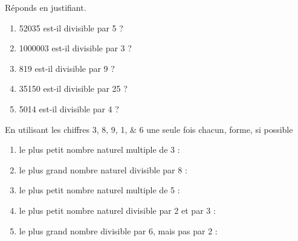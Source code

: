 \documentclass[../../syllabus_1.tex]{subfiles}
\begin{document}
\begin{exercise}
      Réponds en justifiant.
      \begin{enumerate}[itemsep=1cm, after=\vspace*{1cm}]
            \item \num{52035} est-il divisible par 5 ?
            \item \num{1000003} est-il divisible par 3 ?
            \item \num{819} est-il divisible par 9 ?
            \item \num{35150} est-il divisible par 25 ?
            \item \num{5014} est-il divisible par 4 ?
      \end{enumerate}
\end{exercise}

\begin{exercise}
      En utilisant les chiffres \numlist{3;8;9;1;6} une seule fois chacun, forme, si possible
      \begin{enumerate}
            \item le plus petit nombre naturel multiple de 3 :
            \item le plus grand nombre naturel divisible par 8 :
            \item le plus petit nombre naturel multiple de 5 :
            \item le plus petit nombre naturel divisible par 2 et par 3 :
            \item le plus grand nombre divisible par 6, mais pas par 2 :
      \end{enumerate}
\end{exercise}
\end{document}
